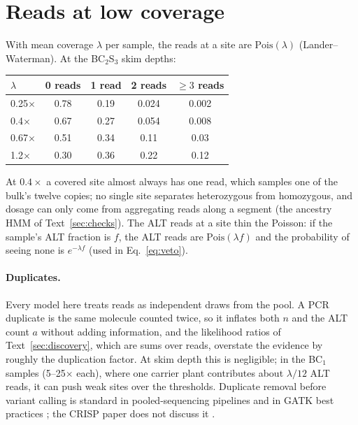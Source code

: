 \documentclass[11pt]{article}
\newcommand{\Pois}{\mathrm{Pois}}
\begin{document}
\section{Reads at low coverage}
\label{sec:reads}

With mean coverage $\lambda$ per sample, the reads at a site are $\Pois(\lambda)$ (Lander--Waterman). At the BC$_2$S$_3$ skim depths:

\begin{center}
\begin{tabular}{lcccc}
\toprule
$\lambda$ & 0 reads & 1 read & 2 reads & $\ge 3$ reads\\
\midrule
0.25$\times$ & 0.78 & 0.19 & 0.024 & 0.002\\
0.4$\times$  & 0.67 & 0.27 & 0.054 & 0.008\\
0.67$\times$ & 0.51 & 0.34 & 0.11 & 0.03\\
1.2$\times$  & 0.30 & 0.36 & 0.22 & 0.12\\
\bottomrule
\end{tabular}
\end{center}

At $0.4\times$ a covered site almost always has one read, which samples one of the bulk's twelve copies; no single site separates
heterozygous from homozygous, and dosage can only come from aggregating reads along a segment (the ancestry HMM of Text~\ref{sec:checks}).
The ALT reads at a site thin the Poisson: if the sample's ALT fraction is $f$, the ALT reads are $\Pois(\lambda f)$ and the probability of seeing
none is $e^{-\lambda f}$ (used in Eq.~\eqref{eq:veto}).

\paragraph{Duplicates.} Every model here treats reads as independent draws from the pool. A PCR duplicate is the same molecule counted
twice, so it inflates both $n$ and the ALT count $a$ without adding information, and the likelihood ratios of Text~\ref{sec:discovery},
which are sums over reads, overstate the evidence by roughly the duplication factor. At skim depth this is negligible; in the BC$_1$ samples
(5--25$\times$ each), where one carrier plant contributes about $\lambda/12$ ALT reads, it can push weak sites over the thresholds. Duplicate
removal before variant calling is standard in pooled-sequencing pipelines \citep{huang2015pooled} and in GATK best practices
\citep{vanderauwera2013}; the CRISP paper does not discuss it \citep{bansal2010crisp}.
\end{document}
